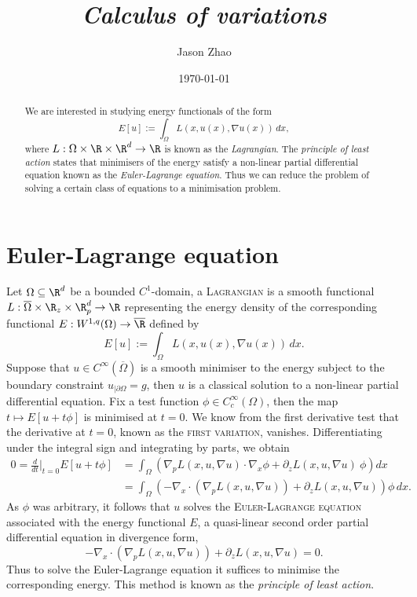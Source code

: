 \documentclass[reqno]{amsart}
\title
{
	\emph{Calculus of variations}
}
\author{Jason Zhao}
\date{\today}
\theoremstyle{definition}
\theoremstyle{remark}
\newcounter{problem}[section]	\declaretheorem[style=thmrecbox,name=Problem, numberlike=problem]{statement}
\renewcommand{\emph}{\textsc}
\begin{document}
\maketitle

\begin{abstract}
	We are interested in studying energy functionals of the form
		\[ E [u] := \int_\Omega L(x, u(x), \nabla u(x)) \, dx, \]
	where $L: \Omega \times \R \times \R^d \to \R$ is known as the \textit{Lagrangian}. The \textit{principle of least action} states that minimisers of the energy satisfy a non-linear partial differential equation known as the \textit{Euler-Lagrange equation}. Thus we can reduce the problem of solving a certain class of equations to a minimisation problem.
\end{abstract}

\tableofcontents

\section{Euler-Lagrange equation}

Let $\Omega \subseteq \R^d$ be a bounded $C^1$-domain, a \emph{Lagrangian} is a smooth functional $L : \overline\Omega \times \R_z \times \R^d_p \to \R$ representing the energy density of the corresponding functional $E : W^{1, q} (\Omega) \to \overline\R$ defined by 
	\[ E[u] := \int_\Omega L(x, u(x), \nabla u (x)) \, dx. \]
Suppose that $u \in C^\infty (\overline \Omega)$ is a smooth minimiser to the energy subject to the boundary constraint $u_{|\partial \Omega} = g$, then $u$ is a classical solution to a non-linear partial differential equation. Fix a test function $\phi \in C^\infty_c (\Omega)$, then the map $t \mapsto E[u + t \phi]$ is minimised at $t = 0$. We know from the first derivative test that the derivative at $t = 0$, known as the \emph{first variation}, vanishes. Differentiating under the integral sign and integrating by parts, we obtain
	\begin{align*}
		 0 = \frac{d}{dt} \Big|_{t = 0} E[u + t \phi] 
		 	&=  \int_\Omega \left(\nabla_p L (x, u, \nabla u) \cdot \nabla_x \phi + \partial_z L (x, u, \nabla u) \ \phi\right) dx \\
			&= \int_\Omega \left( - \nabla_x \cdot (\nabla_p L  (x, u, \nabla u)) + \partial_z L (x, u, \nabla u)  \right)  \phi \, dx.
	\end{align*}	 
As $\phi$ was arbitrary, it follows that $u$ solves the \emph{Euler-Lagrange equation} associated with the energy functional $E$, a quasi-linear second order partial differential equation in divergence form, 
	\[ - \nabla_x \cdot (\nabla_p L  (x, u, \nabla u)) + \partial_z L (x, u, \nabla u) = 0. \]
Thus to solve the Euler-Lagrange equation it suffices to minimise the corresponding energy. This method is known as the \textit{principle of least action}. 
\end{document}

